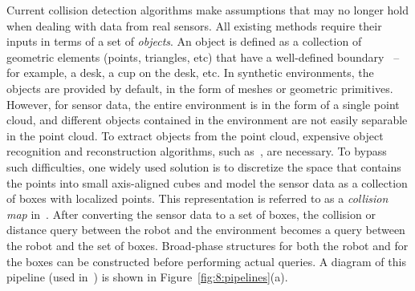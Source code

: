 Current collision detection algorithms make assumptions that may no
longer hold when dealing with data from real sensors.
All existing methods require their inputs in terms of a set of \emph{objects}.
An object is defined as a collection of geometric elements (points, triangles,
etc) that have a well-defined boundary~\cite{Alexe:2010:CVPR} -- for
example, a desk, a cup on the desk, etc.  In synthetic environments,
the objects are provided by default, in the form of meshes or
geometric primitives. However, for sensor data, the entire environment
is in the form of a single point cloud, and different objects
contained in the environment are not easily separable in the point
cloud. To extract objects from the point cloud, expensive object
recognition and reconstruction algorithms, such
as~\cite{Muja:2011:ICRA}, are necessary. To bypass such difficulties,
one widely used solution is to discretize the space that contains the points into small axis-aligned cubes and model the sensor data as a collection of boxes with localized points. This representation is referred to as
a \emph{collision map} in~\cite{Rusu:RPG:2009,Ioan:2010}. After
converting the sensor data to a set of boxes, the collision or
distance query between the robot and the environment becomes a query
between the robot and the set of boxes. Broad-phase structures for
both the robot and for the boxes can be constructed before performing
actual queries.  A diagram of this pipeline (used in~\cite{Rusu:RPG:2009,Ioan:2010}) is shown in
Figure~\ref{fig:8:pipelines}(a).

